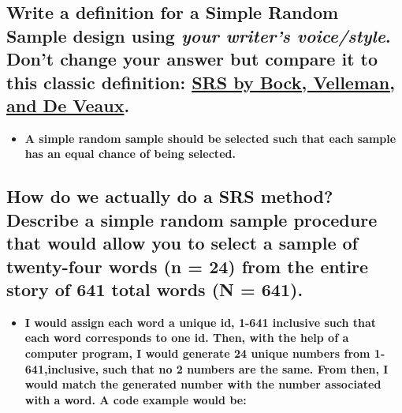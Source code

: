 \documentclass[letterpaper]{article}
\def\tightlist{}
\begin{document}
\subsection{\texorpdfstring{Write a definition for a Simple Random Sample design using \emph{your writer's voice/style}. Don't change your answer but compare it to this classic definition: \href{https://docs.google.com/document/d/1Y23tmrR1wHl2AxauksunEjAzkU21Fq9mGP6WFvAAVpg/edit}{SRS by Bock, Velleman, and De Veaux}.}{Write a definition for a Simple Random Sample design using your writer's voice/style. Don't change your answer but compare it to this classic definition: SRS by Bock, Velleman, and De Veaux.}}\label{write-a-definition-for-a-simple-random-sample-design-using-your-writers-voicestyle.-dont-change-your-answer-but-compare-it-to-this-classic-definition-srs-by-bock-velleman-and-de-veaux.}

\begin{itemize}
\tightlist
\item
  \textbf{A simple random sample should be selected such that each sample has an equal chance of being selected.}
\end{itemize}

\subsection{How do we actually do a SRS method? Describe a simple random sample procedure that would allow you to select a sample of twenty-four words (n = 24) from the entire story of 641 total words (N = 641).}\label{how-do-we-actually-do-a-srs-method-describe-a-simple-random-sample-procedure-that-would-allow-you-to-select-a-sample-of-twenty-four-words-n-24-from-the-entire-story-of-641-total-words-n-641.}

\begin{itemize}
\tightlist
\item
  \textbf{I would assign each word a unique id, 1-641 inclusive such that each word corresponds to one id. Then, with the help of a computer program, I would generate 24 unique numbers from 1-641,inclusive, such that no 2 numbers are the same. From then, I would match the generated number with the number associated with a word. A code example would be:}
\end{itemize}
\end{document}
